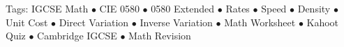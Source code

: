 \documentclass[11pt,a4paper]{article}
\begin{document}
\vspace{14pt}
\begin{center}
  \sffamily\scriptsize\textcolor{textmuted}{
    Tags: IGCSE Math $\bullet$ CIE 0580 $\bullet$ 0580 Extended $\bullet$ Rates $\bullet$ Speed $\bullet$ Density $\bullet$ Unit Cost $\bullet$ Direct Variation $\bullet$ Inverse Variation $\bullet$ Math Worksheet $\bullet$ Kahoot Quiz $\bullet$ Cambridge IGCSE $\bullet$ Math Revision
  }
\end{center}
\end{document}
